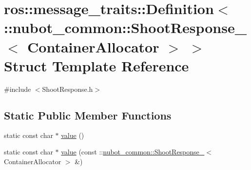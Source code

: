 \hypertarget{structros_1_1message__traits_1_1Definition_3_01_1_1nubot__common_1_1ShootResponse___3_01ContainerAllocator_01_4_01_4}{\section{ros\-:\-:message\-\_\-traits\-:\-:Definition$<$ \-:\-:nubot\-\_\-common\-:\-:Shoot\-Response\-\_\-$<$ Container\-Allocator $>$ $>$ Struct Template Reference}
\label{structros_1_1message__traits_1_1Definition_3_01_1_1nubot__common_1_1ShootResponse___3_01ContainerAllocator_01_4_01_4}
}


{\ttfamily \#include $<$Shoot\-Response.\-h$>$}

\subsection*{Static Public Member Functions}
\begin{DoxyCompactItemize}
\item 
static const char $\ast$ \hyperlink{structros_1_1message__traits_1_1Definition_3_01_1_1nubot__common_1_1ShootResponse___3_01ContainerAllocator_01_4_01_4_ac1b0647c3740eba2c926f237dae1240a}{value} ()
\item 
static const char $\ast$ \hyperlink{structros_1_1message__traits_1_1Definition_3_01_1_1nubot__common_1_1ShootResponse___3_01ContainerAllocator_01_4_01_4_a9eee6c5b36f737233fb994cc82ea9836}{value} (const \-::\hyperlink{structnubot__common_1_1ShootResponse__}{nubot\-\_\-common\-::\-Shoot\-Response\-\_\-}$<$ Container\-Allocator $>$ \&)
\end{DoxyCompactItemize}


